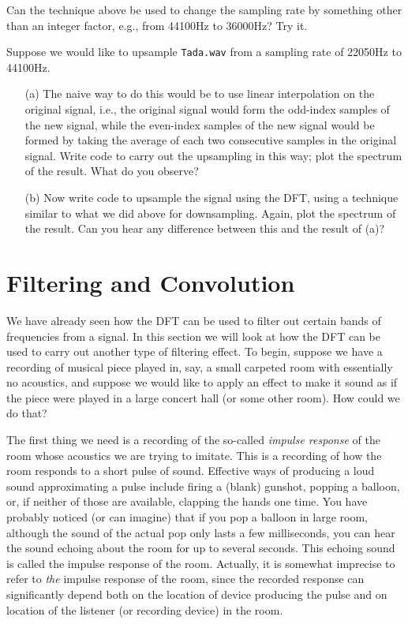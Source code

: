 \begin{problem}
Can the technique above be used to change the sampling rate by something other than an integer factor, e.g., from 44100Hz to 36000Hz? Try it.
\end{problem}

\begin{problem}
Suppose we would like to upsample \texttt{Tada.wav} from a sampling rate of 22050Hz to 44100Hz. \begin{enumerate}
\item[(a)]
The naive way to do this would be to use linear interpolation on the original signal, i.e., the original signal would form the odd-index samples of the new signal, while the even-index samples of the new signal would be formed by taking the average of each two consecutive samples in the original signal. Write code to carry out the upsampling in this way; plot the spectrum of the result. What do you observe?
\item[(b)]Now write code to upsample the signal using the DFT, using a technique similar to what we did above for downsampling. Again, plot the spectrum of the result. Can you hear any difference between this and the result of (a)?
\end{enumerate}
\end{problem}

\section*{Filtering and Convolution}

We have already seen how the DFT can be used to filter out certain bands of frequencies from a signal. In this section we will look at how the DFT can be used to carry out another type of filtering effect. To begin, suppose we have a recording of musical piece played in, say, a small carpeted room with essentially no acoustics, and suppose we would like to apply an effect to make it sound as if the piece were played in a large concert hall (or some other room). How could we do that?

The first thing we need is a recording of the so-called \emph{impulse response} of the room whose acoustics we are trying to imitate. This is a recording of how the room responds to a short pulse of sound. Effective ways of producing a loud sound approximating a pulse include firing a (blank) gunshot, popping a balloon, or, if neither of those are available, clapping the hands one time. You have probably noticed (or can imagine) that if you pop a balloon in large room, although the sound of the actual pop only lasts a few milliseconds, you can hear the sound echoing about the room for up to several seconds. This echoing sound is called the impulse response of the room. Actually, it is somewhat imprecise to refer to \emph{the} impulse response of the room, since the recorded response can significantly depend both on the location of device producing the pulse and on location of the listener (or recording device) in the room.

